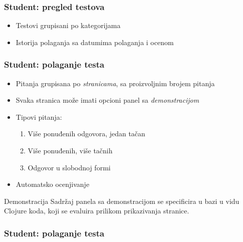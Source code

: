 \documentclass[compress,12pt,hyperref=unicode]{beamer}
\begin{document}
\begin{frame}
\frametitle{Student: pregled testova}
\begin{itemize}
\item Testovi grupisani po kategorijama
\item Istorija polaganja sa datumima polaganja i ocenom
\end{itemize}
\end{frame}

\begin{frame}
\frametitle{Student: polaganje testa}
\begin{itemize}
\item Pitanja grupisana po \emph{stranicama}, sa proizvoljnim brojem pitanja
\item Svaka stranica može imati opcioni panel sa \emph{demonstracijom}
\item Tipovi pitanja:
\begin{enumerate}
\item Više ponuđenih odgovora, jedan tačan
\item Više ponuđenih, više tačnih
\item Odgovor u slobodnoj formi
\end{enumerate}
\item Automatsko ocenjivanje
\end{itemize}
\begin{block}{Demonstracija}
Sadržaj panela sa demonstracijom se specificira u bazi u vidu Clojure koda, koji se evaluira prilikom prikazivanja stranice.
\end{block}
\end{frame}

\begin{frame}
\frametitle{Student: polaganje testa}
\end{frame}
\end{document}
